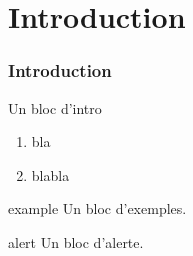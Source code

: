 \section{Introduction}
\begin{frame}
  \frametitle{\color{white}Introduction}
  \begin{block}{Un bloc d'intro}
    \begin{enumerate}
      \item bla
      \item blabla
    \end{enumerate}
  \end{block}
  \begin{exampleblock}{example}
    Un bloc d'exemples.
  \end{exampleblock}
  \begin{alertblock}{alert}
    Un bloc d'alerte.
  \end{alertblock}
\end{frame}
